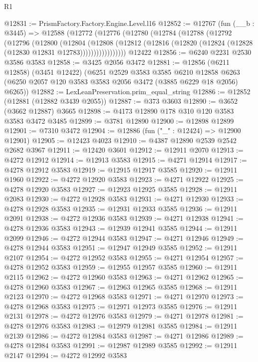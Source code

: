 \begin{lexlean}{R1}
\begin{coremodule}
@12831 := PrismFactory.Factory.Engine.Level.l16
@12852 := @12767
    (fun (__b : @3445) =>
    @12588
      (@12772
        (@12776
          (@12780
            (@12784
              (@12788
                (@12792
                  (@12796
                    (@12800
                      (@12804
                        (@12808
                          (@12812
                            (@12816 (@12820 (@12824 (@12828 (@12830 @12831 @12783)))))))))))))))))
    @12422
@12856 := @6240 @2231 @2530 @3586 @3583
@12858 := @3425 @2056 @3472
@12881 := @12856
    (@6211 @12858)
    (@3451 @12422)
    (@6251
      @2529
      @3583
      @3585
      @6210
      @12858
      @6263
      (@6250 @2057 @120 @3583 @3583 @2056 @3472 (@3885 @6229 @18 @2056) @6265))
@12882 := LexLeanPreservation.prim_equal_string
@12886 := @12852 (@12881 (@12882 @3439 @2055))
@12887 := @373 @3603
@12890 := @3652 (@3662 @12887) @3665
@12898 := @4173 @12890 @178 @310 @120 @3583 @3583 @3472 @3485
@12899 := @3781 @12890
@12900 := @12898 @12899
@12901 := @7310 @3472
@12904 := @12886 (fun ("_" : @12424) => @12900 @12901)
@12905 := @12423 @4023
@12910 := @4387 @12890 @2539 @2542 @2682 @3967
@12911 := @12420 @3601
@12912 := @12911 @2070
@12913 := @4272 @12912
@12914 := @12913 @3583
@12915 := @4271 @12914
@12917 := @4278 @12912 @3583
@12919 := @12915 @12917 @3585
@12920 := @12911 @1960
@12922 := @4272 @12920 @3583
@12923 := @4271 @12922
@12925 := @4278 @12920 @3583
@12927 := @12923 @12925 @3585
@12928 := @12911 @2083
@12930 := @4272 @12928 @3583
@12931 := @4271 @12930
@12933 := @4278 @12928 @3583
@12935 := @12931 @12933 @3585
@12936 := @12911 @2091
@12938 := @4272 @12936 @3583
@12939 := @4271 @12938
@12941 := @4278 @12936 @3583
@12943 := @12939 @12941 @3585
@12944 := @12911 @2099
@12946 := @4272 @12944 @3583
@12947 := @4271 @12946
@12949 := @4278 @12944 @3583
@12951 := @12947 @12949 @3585
@12952 := @12911 @2107
@12954 := @4272 @12952 @3583
@12955 := @4271 @12954
@12957 := @4278 @12952 @3583
@12959 := @12955 @12957 @3585
@12960 := @12911 @2115
@12962 := @4272 @12960 @3583
@12963 := @4271 @12962
@12965 := @4278 @12960 @3583
@12967 := @12963 @12965 @3585
@12968 := @12911 @2123
@12970 := @4272 @12968 @3583
@12971 := @4271 @12970
@12973 := @4278 @12968 @3583
@12975 := @12971 @12973 @3585
@12976 := @12911 @2131
@12978 := @4272 @12976 @3583
@12979 := @4271 @12978
@12981 := @4278 @12976 @3583
@12983 := @12979 @12981 @3585
@12984 := @12911 @2139
@12986 := @4272 @12984 @3583
@12987 := @4271 @12986
@12989 := @4278 @12984 @3583
@12991 := @12987 @12989 @3585
@12992 := @12911 @2147
@12994 := @4272 @12992 @3583

\end{coremodule}
\end{lexlean}
